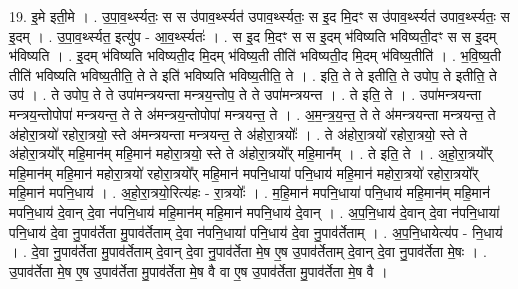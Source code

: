 \documentclass[17pt]{extarticle}
\begin{document}
19. इ॒मे इती॒मे । . उ॒पा॒व॒र्थ्स्यतः॒ स स उ॑पाव॒र्थ्स्यत॑ उपाव॒र्थ्स्यतः॒ स इ॒द मि॒दꣳ स उ॑पाव॒र्थ्स्यत॑ उपाव॒र्थ्स्यतः॒ स इ॒दम् । . उ॒पा॒व॒र्थ्स्यत॒ इत्यु॑प - आ॒व॒र्थ्स्यतः॑ । . स इ॒द मि॒दꣳ स स इ॒दम् भ॑विष्यति भविष्यती॒दꣳ स स इ॒दम् भ॑विष्यति । . इ॒दम् भ॑विष्यति भविष्यती॒द मि॒दम् भ॑विष्य॒ती तीति॑ भविष्यती॒द मि॒दम् भ॑विष्य॒तीति॑ । . भ॒वि॒ष्य॒ती तीति॑ भविष्यति भविष्य॒तीति॒ ते ते इति॑ भविष्यति भविष्य॒तीति॒ ते । . इति॒ ते ते इतीति॒ ते उपोप॒ ते इतीति॒ ते उप॑ । . ते उपोप॒ ते ते उपा॑मन्त्रयन्ता मन्त्रय॒न्तोप॒ ते ते उपा॑मन्त्रयन्त । . ते इति॒ ते । . उपा॑मन्त्रयन्ता मन्त्रय॒न्तोपोपा॑ मन्त्रयन्त॒ ते ते अ॑मन्त्रय॒न्तोपोपा॑ मन्त्रयन्त॒ ते । . अ॒म॒न्त्र॒य॒न्त॒ ते ते अ॑मन्त्रयन्ता मन्त्रयन्त॒ ते अ॑होरा॒त्रयो॑ रहोरा॒त्रयो॒ स्ते अ॑मन्त्रयन्ता मन्त्रयन्त॒ ते अ॑होरा॒त्रयोः᳚ । . ते अ॑होरा॒त्रयो॑ रहोरा॒त्रयो॒ स्ते ते अ॑होरा॒त्रयो᳚र् महि॒मान॑म् महि॒मान॑ महोरा॒त्रयो॒ स्ते ते अ॑होरा॒त्रयो᳚र् महि॒मान᳚म् । . ते इति॒ ते । . अ॒हो॒रा॒त्रयो᳚र् महि॒मान॑म् महि॒मान॑ महोरा॒त्रयो॑ रहोरा॒त्रयो᳚र् महि॒मान॑ मपनि॒धाया॑ पनि॒धाय॑ महि॒मान॑ महोरा॒त्रयो॑ रहोरा॒त्रयो᳚र् महि॒मान॑ मपनि॒धाय॑ । . अ॒हो॒रा॒त्रयो॒रित्य॑हः - रा॒त्रयोः᳚ । . म॒हि॒मान॑ मपनि॒धाया॑ पनि॒धाय॑ महि॒मान॑म् महि॒मान॑ मपनि॒धाय॑ दे॒वान् दे॒वा न॑पनि॒धाय॑ महि॒मान॑म् महि॒मान॑ मपनि॒धाय॑ दे॒वान् । . अ॒प॒नि॒धाय॑ दे॒वान् दे॒वा न॑पनि॒धाया॑ पनि॒धाय॑ दे॒वा नु॒पाव॑र्तेता मु॒पाव॑र्तेताम् दे॒वा न॑पनि॒धाया॑ पनि॒धाय॑ दे॒वा नु॒पाव॑र्तेताम् । . अ॒प॒नि॒धायेत्य॑प - नि॒धाय॑ । . दे॒वा नु॒पाव॑र्तेता मु॒पाव॑र्तेताम् दे॒वान् दे॒वा नु॒पाव॑र्तेता मे॒ष ए॒ष उ॒पाव॑र्तेताम् दे॒वान् दे॒वा नु॒पाव॑र्तेता मे॒षः । . उ॒पाव॑र्तेता मे॒ष ए॒ष उ॒पाव॑र्तेता मु॒पाव॑र्तेता मे॒ष वै वा ए॒ष उ॒पाव॑र्तेता मु॒पाव॑र्तेता मे॒ष वै । \newline
\end{document}
